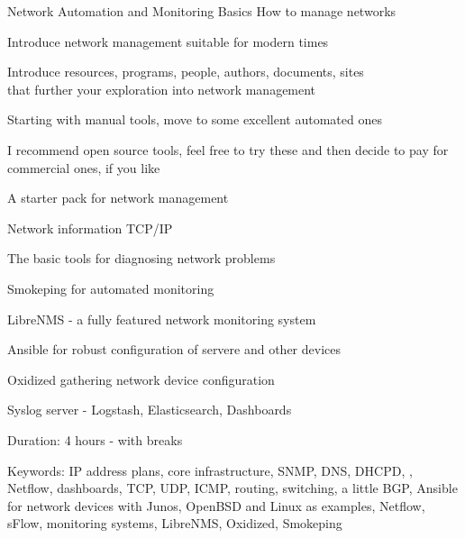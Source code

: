 \documentclass[Screen16to9,17pt]{foils}
\begin{document}
\mytitlepage
{Network Automation and Monitoring Basics}
{How to manage networks}

\hlkprofiluk




\begin{list2}
\item Introduce network management suitable for modern times
\item Introduce resources, programs, people, authors, documents, sites\\
 that further your exploration into network management
\item Starting with manual tools, move to some excellent automated ones
\item I recommend open source tools, feel free to try these and then decide to pay for commercial ones, if you like
\end{list2}




A starter pack for network management

\begin{list2}
\item Network information TCP/IP
\item The basic tools for diagnosing network problems
\item Smokeping for automated monitoring
\item LibreNMS - a fully featured network monitoring system
\item Ansible for robust configuration of servere and other devices
\item Oxidized gathering network device configuration
\item Syslog server - Logstash, Elasticsearch, Dashboards
\end{list2}

Duration: 4 hours - with breaks

Keywords:
IP address plans, core infrastructure, SNMP, DNS, DHCPD, , Netflow, dashboards, TCP, UDP, ICMP, routing, switching, a little BGP, Ansible for network devices with Junos, OpenBSD and Linux as examples, Netflow, sFlow, monitoring systems, LibreNMS, Oxidized, Smokeping


\end{document}
